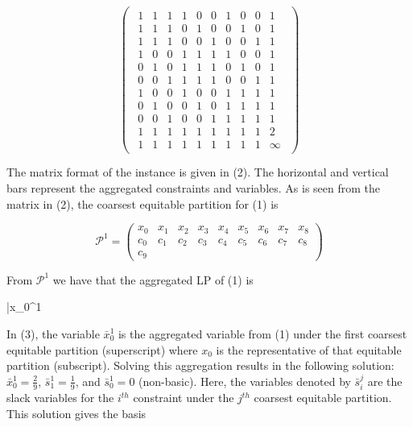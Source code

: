 \documentclass[11pt]{article} %
\begin{document}
\begin{equation}
 	\begin{pmatrix}
 		\begin{array}{ccccccccc|c}
 			1 & 1 & 1 & 1 & 0 & 0 & 1 & 0 & 0 & 1 \\ 
 			1 & 1 & 1 & 0 & 1 & 0 & 0 & 1 & 0 &  1 \\ 
 			1 & 1 & 1 & 0 & 0 & 1 & 0 & 0 & 1 & 1 \\ 
 			1 & 0 & 0 & 1 & 1 & 1 & 1 & 0 & 0 & 1 \\ 
 			0 & 1 & 0 & 1 & 1 & 1 & 0 & 1 & 0 & 1 \\ 
 			0 & 0 & 1 & 1 & 1 & 1 & 0 & 0 & 1 & 1 \\ 
 			1 & 0 & 0 & 1 & 0 & 0 & 1 & 1 & 1 & 1 \\ 
 			0 & 1 & 0 & 0 & 1 & 0 & 1 & 1 & 1 & 1 \\ 
 			0 & 0 & 1 & 0 & 0 & 1 & 1 & 1 & 1 & 1 \\ 
 			\hline
 			1 & 1 & 1 & 1 & 1 & 1 & 1 & 1 & 1 & 2 \\ 
 			\hline
 			1 & 1 & 1 & 1 & 1 & 1 & 1 & 1 & 1 & \infty
 		\end{array}
 	\end{pmatrix}
 \end{equation}
 
	 The matrix format of the instance is given in (2).  The horizontal and vertical bars represent the aggregated constraints and variables. As is seen from the matrix in (2), the coarsest equitable partition for (1) is
	 
	 \begin{equation}
	 	\mathcal{P}^1 = 
	 	\begin{pmatrix} 
	 	x_0 & x_1 & x_2 & x_3 & x_4 & x_5 & x_6 & x_7 & x_8 \\
	 	c_0 & c_1 & c_2 & c_3 & c_4 & c_5 & c_6 & c_7 & c_8 \\
	 	c_9
	 	\end{pmatrix} 
	 \end{equation}
	 
	 From $\mathcal{P}^1$ we have that the aggregated LP of (1) is  
 
 \begin{mini!}
 	{}{\bar{x}_0^1}{}{}
 \end{mini!}

	In (3), the variable $\bar{x}_0^1$ is the aggregated variable from (1) under the first coarsest equitable partition (superscript) where $x_0$ is the representative of that equitable partition (subscript).  Solving this aggregation results in the following solution: $\bar{x}_0^1 = \frac{2}{9}$, $\bar{s}_1^1 = \frac{1}{9}$, and $\bar{s}_0^1 = 0$ (non-basic).  Here, the variables denoted by $\bar{s}_i^j$ are the slack variables for the $i^{th}$ constraint under the $j^{th}$ coarsest equitable partition.  This solution gives the basis
	
\end{document}
